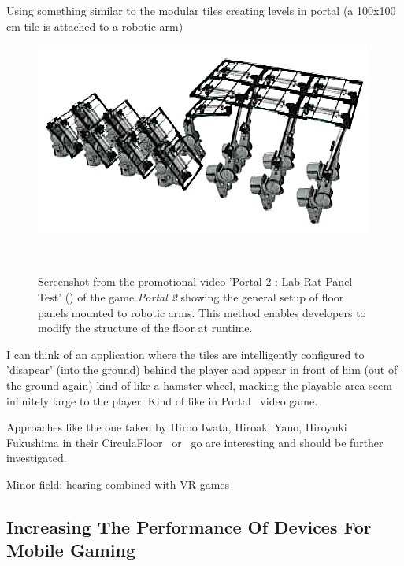 Using something similar to the modular tiles creating levels in portal (a 100x100 cm tile is attached to a robotic arm)

\begin{figure}
	\centering
	\includegraphics[width=0.9\columnwidth]{./figures/portallabrattest}
	\caption[Portal 2 : Lab Rat Panel Test]{Screenshot from the promotional video 'Portal 2 : Lab Rat Panel Test' (\ccbyncsa) of the game \textit{Portal 2 \textregistered\textcopyright} showing the general setup of floor panels mounted to robotic arms. This method enables developers to modify the structure of the floor at runtime.\footnotemark}~\label{fig:portallabrattest}
\end{figure}

I can think of an application where the tiles are intelligently configured to 'disapear' (into the ground) behind the player and appear in front of him (out of the ground again) kind of like a hamster wheel, macking the playable area seem infinitely large to the player. Kind of like in Portal~\cite{game:portal} video game.

Approaches like the one taken by Hiroo Iwata, Hiroaki Yano, Hiroyuki Fukushima in their CirculaFloor~\cite{Iwata:2005:CLI:1078037.1079777} or~\cite{Souman:2010:MVW:1670671.1670675} go are interesting and should be further investigated. 

Minor field: hearing combined with VR games


\subsection{Increasing The Performance Of Devices For Mobile Gaming}
